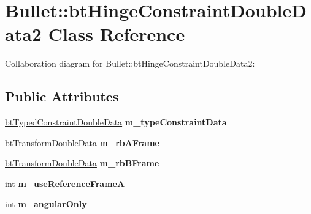 \hypertarget{class_bullet_1_1bt_hinge_constraint_double_data2}{\section{Bullet\+:\+:bt\+Hinge\+Constraint\+Double\+Data2 Class Reference}
\label{class_bullet_1_1bt_hinge_constraint_double_data2}
}


Collaboration diagram for Bullet\+:\+:bt\+Hinge\+Constraint\+Double\+Data2\+:
\subsection*{Public Attributes}
\begin{DoxyCompactItemize}
\item 
\hypertarget{class_bullet_1_1bt_hinge_constraint_double_data2_a955b0b21367fa64274b6334befaacd46}{\hyperlink{class_bullet_1_1bt_typed_constraint_double_data}{bt\+Typed\+Constraint\+Double\+Data} {\bfseries m\+\_\+type\+Constraint\+Data}}\label{class_bullet_1_1bt_hinge_constraint_double_data2_a955b0b21367fa64274b6334befaacd46}

\item 
\hypertarget{class_bullet_1_1bt_hinge_constraint_double_data2_a4e3d5efb76f3e8af16693794b025a9fb}{\hyperlink{class_bullet_1_1bt_transform_double_data}{bt\+Transform\+Double\+Data} {\bfseries m\+\_\+rb\+A\+Frame}}\label{class_bullet_1_1bt_hinge_constraint_double_data2_a4e3d5efb76f3e8af16693794b025a9fb}

\item 
\hypertarget{class_bullet_1_1bt_hinge_constraint_double_data2_adae56c693fe628d4227adc6ea4829100}{\hyperlink{class_bullet_1_1bt_transform_double_data}{bt\+Transform\+Double\+Data} {\bfseries m\+\_\+rb\+B\+Frame}}\label{class_bullet_1_1bt_hinge_constraint_double_data2_adae56c693fe628d4227adc6ea4829100}

\item 
\hypertarget{class_bullet_1_1bt_hinge_constraint_double_data2_a17b6bebe5cc1f1e175f7e886d7baa81f}{int {\bfseries m\+\_\+use\+Reference\+Frame\+A}}\label{class_bullet_1_1bt_hinge_constraint_double_data2_a17b6bebe5cc1f1e175f7e886d7baa81f}

\item 
\hypertarget{class_bullet_1_1bt_hinge_constraint_double_data2_ade8a78cd27b5ef858b95f4c16d9b4407}{int {\bfseries m\+\_\+angular\+Only}}\label{class_bullet_1_1bt_hinge_constraint_double_data2_ade8a78cd27b5ef858b95f4c16d9b4407}


\end{DoxyCompactItemize}
